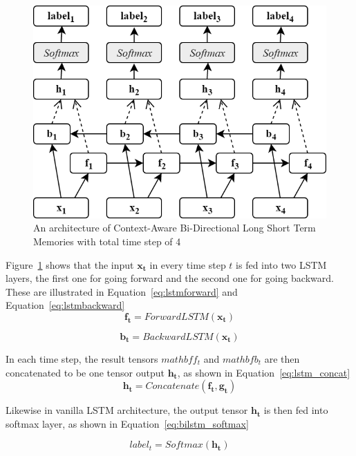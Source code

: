 \begin{figure}
	\centering
	\includegraphics[width=0.75\linewidth]{images/blstm}
	\caption{An architecture of Context-Aware Bi-Directional Long Short Term Memories with total time step of 4}
	\label{fig:bilstm}
\end{figure}

Figure~\ref{fig:bilstm} shows that the input $\mathbf{x_{t}}$ in every time step $t$ is fed into two LSTM layers, the first one for going forward and the second one for going backward. These are illustrated in Equation~\ref{eq:lstmforward} and Equation~\ref{eq:lstmbackward}
\begin{equation}
\label{eq:lstmforward}
\mathbf{f_{t}} = ForwardLSTM(\mathbf{x_{t}})
\end{equation}

\begin{equation}
\label{eq:lstmbackward}
\mathbf{b_{t}} = BackwardLSTM(\mathbf{x_{t}})
\end{equation}

In each time step, the result tensors $mathbf{f_{t}}$ and $mathbf{b_{t}}$ are then concatenated to be one tensor output $\mathbf{h_{t}}$, as shown in Equation~\ref{eq:lstm_concat}
\begin{equation}
\label{eq:lstm_concat}
\mathbf{h_{t}} = Concatenate(\mathbf{f_{t}}, \mathbf{g_{t}})
\end{equation}

Likewise in vanilla LSTM architecture, the output tensor $\mathbf{h_{t}}$ is then fed into softmax layer, as shown in Equation~\ref{eq:bilstm_softmax}

\begin{equation}
\label{eq:bilstm_softmax}
label_{t} = Softmax(\mathbf{h_{t}})
\end{equation}

